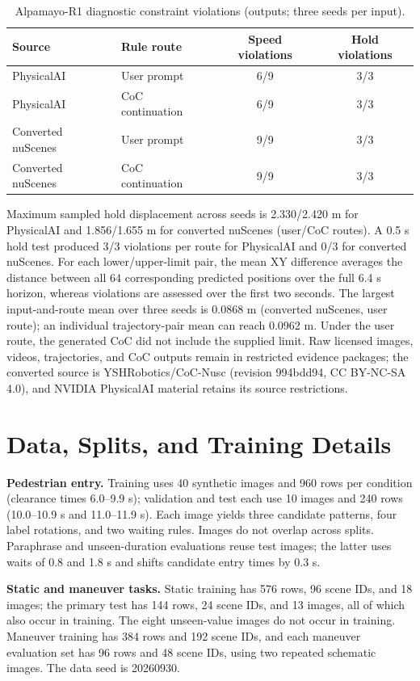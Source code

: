 \documentclass[10pt]{article}
\begin{document}
\begin{table}[h]
\centering\small
\caption{Alpamayo-R1 diagnostic constraint violations (outputs; three seeds per input).}
\begin{tabular}{llcc}
\toprule
Source & Rule route & Speed violations & Hold violations\\
\midrule
PhysicalAI & User prompt & 6/9 & 3/3\\
PhysicalAI & CoC continuation & 6/9 & 3/3\\
Converted nuScenes & User prompt & 9/9 & 3/3\\
Converted nuScenes & CoC continuation & 9/9 & 3/3\\
\bottomrule
\end{tabular}
\end{table}

Maximum sampled hold displacement across seeds is 2.330/2.420 m for PhysicalAI
and 1.856/1.655 m for converted nuScenes (user/CoC routes). A 0.5 s hold test
produced 3/3 violations per route for PhysicalAI and 0/3 for converted nuScenes.
For each lower/upper-limit pair, the mean XY difference averages the distance
between all 64 corresponding predicted positions over the full 6.4 s horizon,
whereas violations are assessed over the first two seconds. The largest input-and-route mean
over three seeds is 0.0868 m (converted nuScenes, user route); an individual
trajectory-pair mean can reach 0.0962 m. Under the user route, the generated CoC did not
include the supplied limit. Raw licensed images, videos, trajectories, and CoC
outputs remain in restricted evidence packages; the converted source is
YSHRobotics/CoC-Nusc (revision 994bdd94, CC BY-NC-SA 4.0), and NVIDIA
PhysicalAI material retains its source restrictions.

\section{Data, Splits, and Training Details}\label{sup:data}

\textbf{Pedestrian entry.} Training uses 40 synthetic images and 960 rows per
condition (clearance times 6.0--9.9 s); validation and test each use 10 images
and 240 rows (10.0--10.9 s and 11.0--11.9 s). Each image yields three candidate
patterns, four label rotations, and two waiting rules. Images do not overlap
across splits. Paraphrase and unseen-duration evaluations reuse test images;
the latter uses waits of 0.8 and 1.8 s and shifts candidate entry times by
0.3 s.

\textbf{Static and maneuver tasks.} Static training has 576 rows, 96 scene IDs,
and 18 images; the primary test has 144 rows, 24 scene IDs, and 13 images, all
of which also occur in training. The eight unseen-value images do not occur in
training. Maneuver training has 384 rows and 192 scene IDs, and each maneuver
evaluation set has 96 rows and 48 scene IDs, using two repeated schematic
images. The data seed is 20260930.
\end{document}
